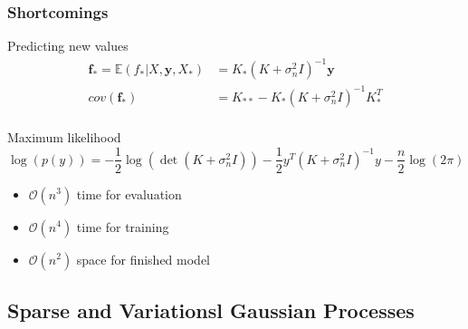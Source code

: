 \begin{frame}
    \frametitle{Shortcomings}

    \begin{block}{Predicting new values}
        \begin{equation*}
                \begin{aligned}
                    \mathbf{f_*} = \mathbb{E}\left(f_*|X, \mathbf{y}, X_*\right) &=
                    K_*\left(K + \sigma_n^2I\right)^{-1}\mathbf{y} \\
                    cov(\mathbf{f_*}) &= K_{**} - K_*\left(K +\sigma_n^2I\right)^{-1}K_*^T \\
                \end{aligned}
        \end{equation*}
    \end{block}

    \begin{block}{Maximum likelihood}
        \begin{equation*}
                \log(p(y)) = - \frac{1}{2}\log{\left(
                                \det{\left(
                                        K + \sigma_n^2I
                                \right)}
                            \right)}
                - \frac{1}{2}y^T\left(
                                    K + \sigma_n^2I
                                \right)^{-1}y
                - \frac{n}{2}\log{\left(2\pi\right)}
        \end{equation*}
    \end{block}

    \pause
    \begin{itemize}
        \item $\mathcal{O}(n^3)$ time for evaluation
        \item $\mathcal{O}(n^4)$ time for training
        \item $\mathcal{O}(n^2)$ space for finished model
    \end{itemize}
\end{frame}

\subsection{Sparse and Variationsl Gaussian Processes}

